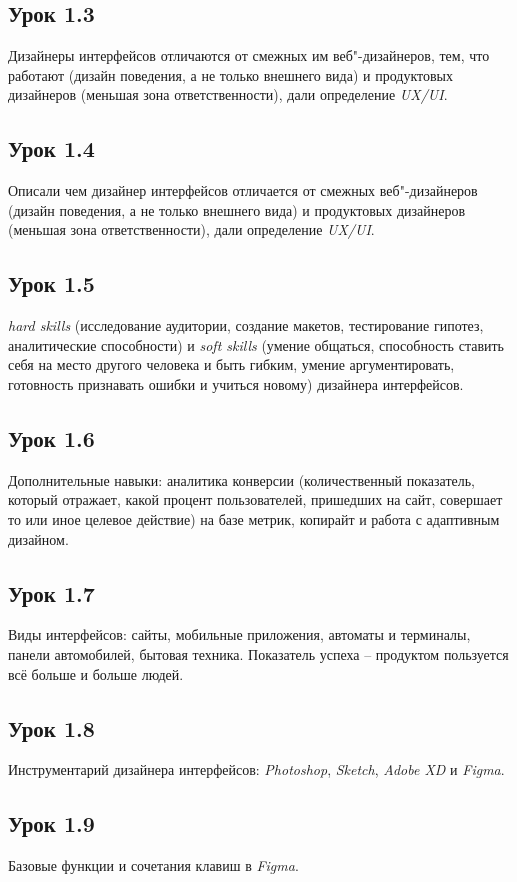 \documentclass[variant=practice]{bsuir}
\begin{document}
\subsection{Урок 1.3} Дизайнеры интерфейсов отличаются от смежных им
веб"-дизайнеров, тем, что работают (дизайн поведения, а не только внешнего вида)
и продуктовых дизайнеров (меньшая зона ответственности), дали определение
\textit{UX/UI}.

\subsection{Урок 1.4} Описали чем дизайнер интерфейсов отличается от смежных
веб"-дизайнеров (дизайн поведения, а не только внешнего вида) и
продуктовых дизайнеров (меньшая зона ответственности), дали
определение \textit{UX/UI}.

\subsection{Урок 1.5} \textit{hard skills} (исследование аудитории, создание
макетов, тестирование гипотез, аналитические способности) и \textit{soft skills}
(умение общаться, способность ставить себя на место другого человека и быть
гибким, умение аргументировать, готовность признавать ошибки и учиться новому)
дизайнера интерфейсов.

\subsection{Урок 1.6} Дополнительные навыки: аналитика конверсии (количественный
показатель, который отражает, какой процент пользователей, пришедших на сайт,
совершает то или иное целевое действие) на базе метрик, копирайт и работа с
адаптивным дизайном.

\subsection{Урок 1.7} Виды интерфейсов: сайты, мобильные приложения, автоматы и
терминалы, панели автомобилей, бытовая техника. Показатель успеха -- продуктом
пользуется всё больше и больше людей.

\subsection{Урок 1.8} Инструментарий дизайнера интерфейсов: \textit{Photoshop},
\textit{Sketch}, \textit{Adobe XD} и \textit{Figma}.

\subsection{Урок 1.9} Базовые функции и сочетания клавиш в \textit{Figma}.
\end{document}
